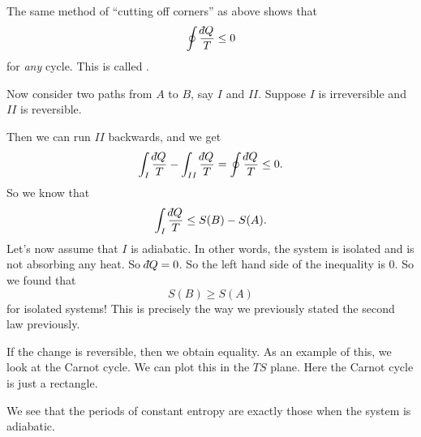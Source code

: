 \documentclass[a4paper]{article}
\def\di{{\mathchar'26\mkern-12mu d}}
\begin{document}
The same method of ``cutting off corners'' as above shows that
\[
  \oint \frac{\di Q}{T} \leq 0
\]
for \emph{any} cycle. This is called .

Now consider two paths from $A$ to $B$, say $I$ and $II$. Suppose $I$ is irreversible and $II$ is reversible.
\begin{center}
\end{center}
Then we can run $II$ backwards, and we get
\[
  \int_I \frac{\di Q}{T} - \int_{II} \frac{\di Q}{T} = \oint \frac{\di Q}{T} \leq 0.
\]
So we know that
\[
  \int_I \frac{\di Q}{T} \leq S(B) - S(A).
\]
Let's now assume that $I$ is adiabatic. In other words, the system is isolated and is not absorbing any heat. So $\di Q = 0$. So the left hand side of the inequality is $0$. So we found that
\[
  S(B) \geq S(A)
\]
for isolated systems! This is precisely the way we previously stated the second law previously.

If the change is reversible, then we obtain equality. As an example of this, we look at the Carnot cycle. We can plot this in the $TS$ plane. Here the Carnot cycle is just a rectangle.
\begin{center}
\end{center}
We see that the periods of constant entropy are exactly those when the system is adiabatic.
\end{document}
